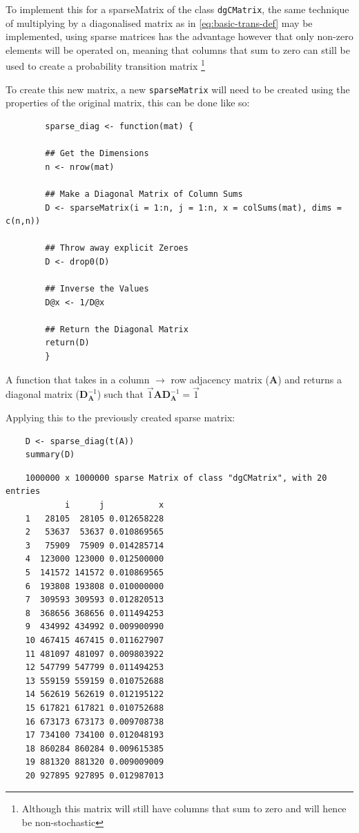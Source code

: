 \documentclass[11pt]{report}
\begin{document}
To implement this for a sparseMatrix of the class \texttt{dgCMatrix}, the same
technique of multiplying by a diagonalised matrix as in \eqref{eq:basic-trans-def} may be
implemented, using sparse matrices has the advantage however that only non-zero
elements will be operated on, meaning that columns that sum to zero can still
be used to create a probability transition matrix \footnote{Although this matrix will
still have columns that sum to zero and will hence be non-stochastic}

To create this new matrix, a new \texttt{sparseMatrix} will
need to be created using the properties of the original matrix, this can be done
like so:

\begin{listing}[htbp]
    \begin{tcolorbox}
        \begin{verbatim}
        sparse_diag <- function(mat) {

        ## Get the Dimensions
        n <- nrow(mat)

        ## Make a Diagonal Matrix of Column Sums
        D <- sparseMatrix(i = 1:n, j = 1:n, x = colSums(mat), dims = c(n,n))

        ## Throw away explicit Zeroes
        D <- drop0(D)

        ## Inverse the Values
        D@x <- 1/D@x

        ## Return the Diagonal Matrix
        return(D)
        }
        \end{verbatim}
    \end{tcolorbox}
\caption{\label{sparse-diag} A function that takes in a column \(\rightarrow\) row adjacency matrix (\(\mathbf{A}\)) and returns a diagonal matrix (\(\mathbf{D}^{-1}_{\mathbf{A}}\)) such that \(\vec{1}\mathbf{A} \mathbf{D}^{-1}_{\mathbf{A}} = \vec{1}\)}
\end{listing}

Applying this to the previously created sparse matrix:

\begin{tcolorbox}
    \begin{verbatim}
    D <- sparse_diag(t(A))
    summary(D)
    \end{verbatim}
\tcblower
    \begin{verbatim}
    1000000 x 1000000 sparse Matrix of class "dgCMatrix", with 20 entries
            i      j           x
    1   28105  28105 0.012658228
    2   53637  53637 0.010869565
    3   75909  75909 0.014285714
    4  123000 123000 0.012500000
    5  141572 141572 0.010869565
    6  193808 193808 0.010000000
    7  309593 309593 0.012820513
    8  368656 368656 0.011494253
    9  434992 434992 0.009900990
    10 467415 467415 0.011627907
    11 481097 481097 0.009803922
    12 547799 547799 0.011494253
    13 559159 559159 0.010752688
    14 562619 562619 0.012195122
    15 617821 617821 0.010752688
    16 673173 673173 0.009708738
    17 734100 734100 0.012048193
    18 860284 860284 0.009615385
    19 881320 881320 0.009009009
    20 927895 927895 0.012987013
    \end{verbatim}
\end{tcolorbox}
\end{document}
